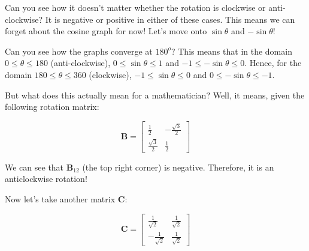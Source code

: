 \documentclass{article}
\begin{document}
Can you see how it doesn't matter whether the rotation is clockwise or anti-clockwise? It is negative or positive in either of these cases. This means we can forget about the cosine graph for now! Let's move onto $\sin \theta$ and $-\sin \theta$!


Can you see how the graphs converge at $180^o$? This means that in the domain $0 \leq \theta \leq 180$ (anti-clockwise), $0 \leq \sin \theta \leq 1$ and $-1 \leq -\sin \theta \leq 0$. Hence, for the domain $180 \leq \theta \leq 360$ (clockwise), $-1 \leq \sin \theta \leq 0$ and $0 \leq -\sin \theta \leq -1$.

But what does this actually mean for a mathematician? Well, it means, given the following rotation matrix:

\[\boldsymbol{B} =  \begin{bmatrix}\frac{1}{2} & -\frac{\sqrt{3}}{2} \\[6pt] \frac{\sqrt{3}}{2} & \frac{1}{2} \end{bmatrix} \]

We can see that $\boldsymbol{B}_{12}$  (the top right corner) is negative. Therefore, it is an anticlockwise rotation!

Now let's take another matrix $\boldsymbol{C}$:

\[\boldsymbol{C} =  \begin{bmatrix}\frac{1}{\sqrt{2}} & \frac{1}{\sqrt{2}} \\[6pt] -\frac{1}{\sqrt{2}} & \frac{1}{\sqrt{2}} \end{bmatrix} \]
\end{document}

